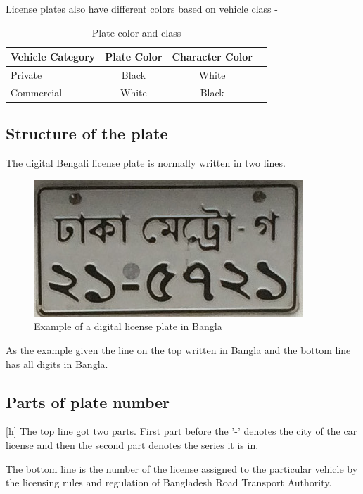 \documentclass{standalone}
\begin{document}
License plates also have different colors based on vehicle class -
\begin{table}[hb]
	\centering
	\label{tab:error5}
	\begin{tabular}{|l|c|c|c|}
		\hline
		\multicolumn{1}{|c|}{Vehicle Category}
		& \multicolumn{1}{|c|}{Plate Color}
		& \multicolumn{1}{|c|}{Character Color} \\ 
		\hline
		    
		Private     & Black & White \\ \hline
		Commercial  & White & Black \\ \hline
		
	\end{tabular}
	\caption{Plate color and class}
\end{table}



\subsection{Structure of the plate}
The digital Bengali license plate is normally written in two lines.

    \begin{figure}[ht]
    \centering
    \includegraphics[scale=0.8]{./img/sample_plate}
    \caption{Example of a digital license plate in Bangla}
	\label{fig:EX}
    \end{figure}

\par
As the example given the line on the top written in Bangla and the bottom line has all digits in Bangla.    

\subsection{Parts of plate number}[h]
The top line got two parts. First part before the '-' denotes the city of the car license and then the second part denotes the series it is in.

The bottom line is the number of the license assigned to the particular vehicle by the licensing rules and regulation of Bangladesh Road Transport Authority.
\end{document}
